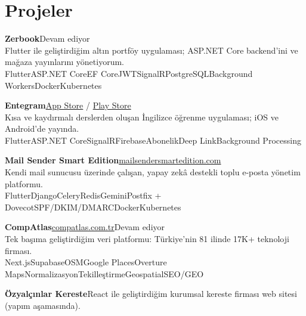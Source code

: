 \documentclass[10pt,a4paper]{extarticle}
\newcommand{\sep}{\;\textperiodcentered\;}
\newcommand{\tech}[1]{{\footnotesize\color{muted}#1}}
\begin{document}
\section{Projeler}
\begin{bullets}[itemsep=1pt]

\item \textbf{Zerbook}\hfill{\color{muted}Devam ediyor}\\
Flutter ile geliştirdiğim altın portföy uygulaması; ASP.NET Core backend'ini ve mağaza yayınlarını yönetiyorum.\\[0.5pt]
\tech{Flutter\sep ASP.NET Core\sep EF Core\sep JWT\sep SignalR\sep PostgreSQL\sep Background Workers\sep Docker\sep Kubernetes}

\item \textbf{Entegram}\sep\href{https://apps.apple.com/tr/app/entegram-kayd\%C4\%B1r-\%C3\%B6\%C4\%9Fren/id6766254758?l=tr}{App Store} / \href{https://play.google.com/store/apps/details?id=com.enesorhan.gibigram.gibigram_mobile}{Play Store}\\
Kısa ve kaydırmalı derslerden oluşan İngilizce öğrenme uygulaması; iOS ve Android'de yayında.\\[0.5pt]
\tech{Flutter\sep ASP.NET Core\sep SignalR\sep Firebase\sep Abonelik\sep Deep Link\sep Background Processing}

\item \textbf{Mail Sender Smart Edition}\sep\href{https://mailsendersmartedition.com}{mailsendersmartedition.com}\\
Kendi mail sunucusu üzerinde çalışan, yapay zekâ destekli toplu e-posta yönetim platformu.\\[0.5pt]
\tech{Flutter\sep Django\sep Celery\sep Redis\sep Gemini\sep Postfix + Dovecot\sep SPF/DKIM/DMARC\sep Docker\sep Kubernetes}

\item \textbf{CompAtlas}\sep\href{https://compatlas.com.tr/}{compatlas.com.tr}\hfill{\color{muted}Devam ediyor}\\
Tek başıma geliştirdiğim veri platformu: Türkiye'nin 81 ilinde 17K+ teknoloji firması.\\[0.5pt]
\tech{Next.js\sep Supabase\sep OSM\sep Google Places\sep Overture Maps\sep Normalizasyon\sep Tekilleştirme\sep Geospatial\sep SEO/GEO}

\item \textbf{Özyalçınlar Kereste}\sep React ile geliştirdiğim kurumsal kereste firması web sitesi {\color{muted}(yapım aşamasında)}.

\end{bullets}
\end{document}
